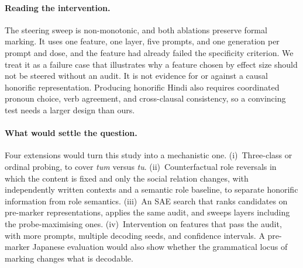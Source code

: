 \documentclass[11pt]{article}
\newcommand{\tum}{\textit{tum}}
\newcommand{\tu}{\textit{tu}}
\begin{document}
\paragraph{Reading the intervention.}
The steering sweep is non-monotonic, and both ablations preserve formal marking.
It uses one feature, one layer, five prompts, and one generation per prompt and
dose, and the feature had already failed the specificity criterion. We treat it
as a failure case that illustrates why a feature chosen by effect size should
not be steered without an audit. It is not evidence for or against a causal
honorific representation. Producing honorific Hindi also requires coordinated
pronoun choice, verb agreement, and cross-clausal consistency, so a convincing
test needs a larger design than ours.

\paragraph{What would settle the question.}
Four extensions would turn this study into a mechanistic one.
(i)~Three-class or ordinal probing, to cover \tum{} versus \tu{}.
(ii)~Counterfactual role reversals in which the content is fixed and only the
social relation changes, with independently written contexts and a semantic
role baseline, to separate honorific information from role semantics.
(iii)~An SAE search that ranks candidates on pre-marker representations, applies
the same audit, and sweeps layers including the probe-maximising ones.
(iv)~Intervention on features that pass the audit, with more prompts, multiple
decoding seeds, and confidence intervals. A pre-marker Japanese evaluation would
also show whether the grammatical locus of marking changes what is decodable.
\end{document}
